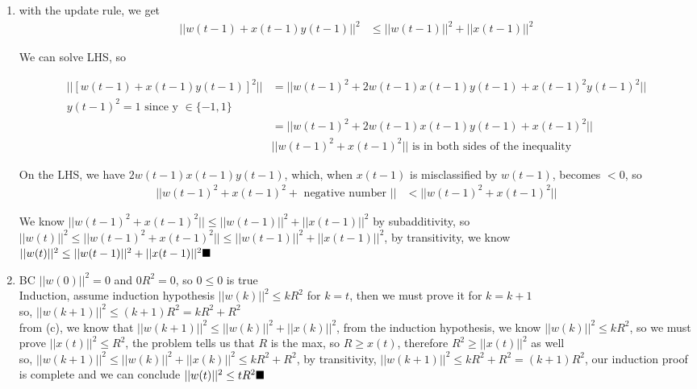\documentclass{article}
\begin{document}
\begin{enumerate}
\begin{enumerate}[label=(\alph*)]
            \item with the update rule, we get
            \begin{align*}
                ||w(t-1) + x(t-1)y(t-1)||^2 &\leq ||w(t-1)||^2 + ||x(t-1)||^2
            \end{align*}
            \begin{center}
                We can solve LHS, so
            \end{center}

            \begin{align*}
                ||[w(t-1) + x(t-1)y(t-1)]^2|| &= ||w(t-1)^2 + 2w(t-1)x(t-1)y(t-1) + x(t-1)^2y(t-1)^2||\\
                y(t-1)^2 = 1 \text{ since y } \in\{-1, 1\}\\
                &=||w(t-1)^2 + 2w(t-1)x(t-1)y(t-1) + x(t-1)^2||\\
                &||w(t-1)^2+x(t-1)^2|| \text{ is in both sides of the inequality}
            \end{align*}

            On the LHS, we have $2w(t-1)x(t-1)y(t-1)$, which, when $x(t-1)$ is misclassified by $w(t-1)$, becomes $<0$, so
            \begin{align*}
                ||w(t-1)^2 + x(t-1)^2 + \text{ negative number }|| &<||w(t-1)^2+x(t-1)^2||
            \end{align*}
            
            We know $||w(t-1)^2 + x(t-1)^2|| \leq ||w(t-1)||^2 + ||x(t-1)||^2$ by subadditivity, so $||w(t)||^2 \leq ||w(t-1)^2 + x(t-1)^2|| \leq ||w(t-1)||^2 + ||x(t-1)||^2$, by transitivity, we know \\ $||w(t)||^2 \leq ||w(t-1)||^2 + ||x(t-1)||^2 \hfill \blacksquare$
        
            \item BC $||w(0)||^2 = 0$ and $0R^2 = 0$, so $0 \leq 0$ is true\\[0.25in]
            Induction, assume induction hypothesis $||w(k)||^2 \leq kR^2$ for $k = t$, then we must prove it for $k = k + 1$\\[0.25in]
            so, $||w(k+1)||^2 \leq (k+1)R^2 = kR^2 + R^2$\\[0.25in]
            from (c), we know that $||w(k+1)||^2 \leq ||w(k)||^2 + ||x(k)||^2$, from the induction hypothesis, we know $||w(k)||^2 \leq kR^2$, so we must prove $||x(t)||^2 \leq R^2$, the problem tells us that $R$ is the max, so $R \geq x(t)$, therefore $R^2 \geq ||x(t)||^2$ as well\\[0.25in]
            so, $||w(k+1)||^2 \leq ||w(k)||^2 + ||x(k)||^2 \leq kR^2 + R^2$, by transitivity, $||w(k+1)||^2 \leq kR^2 + R^2 = (k + 1)R^2$, our induction proof is complete and we can conclude $||w(t)||^2 \leq tR^2 \hfill \blacksquare$
            

\end{enumerate}
\end{enumerate}
\end{document}
